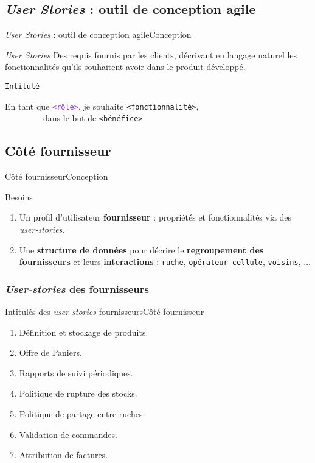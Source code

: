 \documentclass[usenames,dvipsnames]{beamer}
\begin{document}
\subsection{\protect\textit{User Stories} : outil de conception agile}
\begin{frame}{\textit{User Stories} : outil de conception agile}{Conception}
\begin{block}{\textit{User Stories}}
Des requis fournis par les clients, décrivant en langage naturel les fonctionnalités qu'ils souhaitent avoir dans le produit développé.
\end{block}

\begin{block}{\textcolor{Sepia}{\texttt{Intitulé}}}
\begin{it}
  En tant que \textcolor{DarkOrchid}{\texttt{<rôle>}}, je souhaite \textcolor{BrickRed}{\texttt{<fonctionnalité>}}, \\
  ~~~~~~~~~dans le but de \textcolor{OliveGreen}{\texttt{<bénéfice>}}.
\end{it}
\end{block}
\end{frame}

\subsection{Côté fournisseur}
\begin{frame}{Côté fournisseur}{Conception}
\begin{block}{Besoins}
\begin{enumerate}
  \item Un profil d'utilisateur \textbf{fournisseur} : propriétés et fonctionnalités via des \textit{user-stories}.
  \item Une \textbf{structure de données} pour décrire le \textbf{regroupement des fournisseurs} et leurs \textbf{interactions} : \texttt{ruche}, \texttt{opérateur cellule}, \texttt{voisins}, $\dots$
\end{enumerate}
\end{block}
\end{frame}

\subsubsection*{\protect\textit{User-stories} des fournisseurs}
\begin{frame}{Intitulés des \textit{user-stories} fournisseurs}{Côté fournisseur}
\begin{enumerate}
  \item Définition et stockage de produits.
  \item Offre de Paniers.
  \item Rapports de suivi périodiques.
  \item Politique de rupture des stocks.
  \item Politique de partage entre ruches.
  \item Validation de commandes.
  \item Attribution de factures.
\end{enumerate}
\end{frame}
\end{document}
